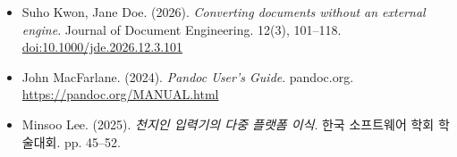 \documentclass[11pt]{article}
\date{}
\begin{document}
\begin{itemize}
\item Suho Kwon, Jane Doe. (2026). \emph{Converting documents without an
external engine}. Journal of Document Engineering. 12(3), 101--118.
\href{https://doi.org/10.1000/jde.2026.12.3.101}{doi:10.1000/jde.2026.12.3.101}
\item John MacFarlane. (2024). \emph{Pandoc User's Guide}. pandoc.org.
\url{https://pandoc.org/MANUAL.html}
\item Minsoo Lee. (2025). \emph{천지인 입력기의 다중 플랫폼 이식}. 한국 소프트웨어 학회 학술대회. pp.
45--52.
\end{itemize}
\end{document}
